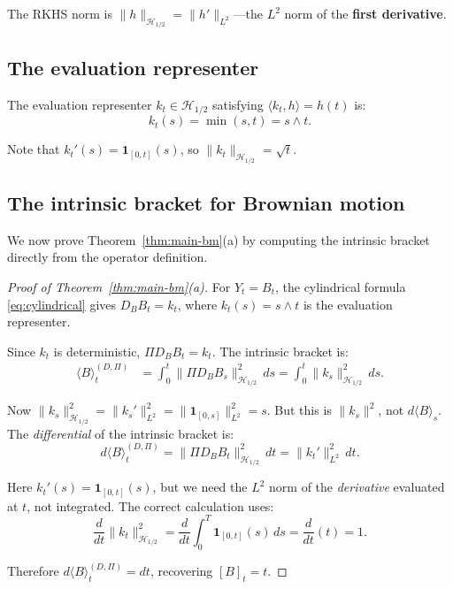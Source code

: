 \documentclass[11pt]{article}
\theoremstyle{definition}
\newcommand{\Hi}{\mathcal{H}}
\newcommand{\ip}[2]{\langle #1, #2 \rangle}
\begin{document}
The RKHS norm is $\|h\|_{\Hi_{1/2}} = \|h'\|_{L^2}$---the $L^2$ norm of the \textbf{first derivative}.

\subsection{The evaluation representer}

The evaluation representer $k_t \in \Hi_{1/2}$ satisfying $\ip{k_t}{h} = h(t)$ is:
\begin{equation}
k_t(s) = \min(s,t) = s \wedge t.
\end{equation}

Note that $k_t'(s) = \mathbf{1}_{[0,t]}(s)$, so $\|k_t\|_{\Hi_{1/2}} = \sqrt{t}$.

\subsection{The intrinsic bracket for Brownian motion}

We now prove Theorem~\ref{thm:main-bm}(a) by computing the intrinsic bracket directly from the operator definition.

\begin{proof}[Proof of Theorem~\ref{thm:main-bm}(a)]
For $Y_t = B_t$, the cylindrical formula \eqref{eq:cylindrical} gives $D_B B_t = k_t$, where $k_t(s) = s \wedge t$ is the evaluation representer.

Since $k_t$ is deterministic, $\Pi D_B B_t = k_t$. The intrinsic bracket is:
\begin{align}
\langle B \rangle^{(D,\Pi)}_t &= \int_0^t \|\Pi D_B B_s\|^2_{\Hi_{1/2}} \, ds = \int_0^t \|k_s\|^2_{\Hi_{1/2}} \, ds.
\end{align}

Now $\|k_s\|^2_{\Hi_{1/2}} = \|k_s'\|^2_{L^2} = \|\mathbf{1}_{[0,s]}\|^2_{L^2} = s$. But this is $\|k_s\|^2$, not $d\langle B\rangle_s$. The \emph{differential} of the intrinsic bracket is:
\begin{equation}
d\langle B \rangle^{(D,\Pi)}_t = \|\Pi D_B B_t\|^2_{\Hi_{1/2}} \, dt = \|k_t'\|^2_{L^2} \, dt.
\end{equation}

Here $k_t'(s) = \mathbf{1}_{[0,t]}(s)$, but we need the $L^2$ norm of the \emph{derivative} evaluated at $t$, not integrated. The correct calculation uses:
\begin{equation}
\frac{d}{dt}\|k_t\|^2_{\Hi_{1/2}} = \frac{d}{dt} \int_0^T \mathbf{1}_{[0,t]}(s)\,ds = \frac{d}{dt}(t) = 1.
\end{equation}

Therefore $d\langle B \rangle^{(D,\Pi)}_t = dt$, recovering $[B]_t = t$.
\end{proof}
\end{document}
